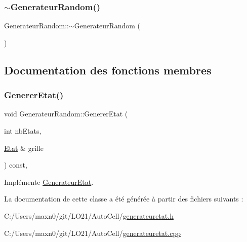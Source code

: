 \mbox{\label{class_generateur_random_a6e8465717258a90158700cd4120ce10b}} 
\subsubsection{\texorpdfstring{$\sim$\+Generateur\+Random()}{~GenerateurRandom()}}
{\footnotesize\ttfamily Generateur\+Random\+::$\sim$\+Generateur\+Random (\begin{DoxyParamCaption}{ }\end{DoxyParamCaption})\hspace{0.3cm}{\ttfamily [default]}}



\subsection{Documentation des fonctions membres}
\mbox{\label{class_generateur_random_ab110072502487c78f0b7dc0c7f2241c7}} 
\subsubsection{\texorpdfstring{Generer\+Etat()}{GenererEtat()}}
{\footnotesize\ttfamily void Generateur\+Random\+::\+Generer\+Etat (\begin{DoxyParamCaption}\item[{int}]{nb\+Etats,  }\item[{\mbox{\hyperlink{class_etat}{Etat}} \&}]{grille }\end{DoxyParamCaption}) const\hspace{0.3cm}{\ttfamily [override]}, {\ttfamily [virtual]}}



Implémente \mbox{\hyperlink{class_generateur_etat_a0698d6706e0aaa2e597bdaf280806835}{Generateur\+Etat}}.



La documentation de cette classe a été générée à partir des fichiers suivants \+:\begin{DoxyCompactItemize}
\item 
C\+:/\+Users/maxn0/git/\+L\+O21/\+Auto\+Cell/\mbox{\hyperlink{generateuretat_8h}{generateuretat.\+h}}\item 
C\+:/\+Users/maxn0/git/\+L\+O21/\+Auto\+Cell/\mbox{\hyperlink{generateuretat_8cpp}{generateuretat.\+cpp}}\end{DoxyCompactItemize}
